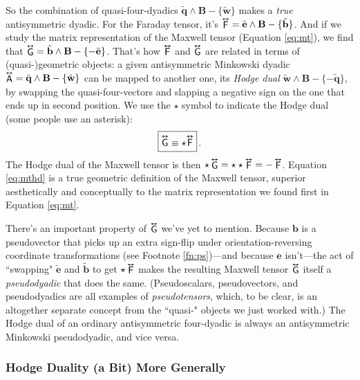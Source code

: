 \documentclass[12pt]{article}
\renewcommand{\vv}[1]{\mathbf{#1}}
\newcommand{\tightoverset}[2]{%
  \mathop{#2}\limits^{\vbox to -.5ex{\kern-0.75ex\hbox{$#1$}\vss}}}
\newcommand{\inlinedy}[1]{\tightoverset{\text{\tiny$\bm\leftrightarrow$}}{#1}}
\newcommand{\capdy}[1]{ \overset{ \text{\tiny$\bm\leftrightarrow$} }{\vphantom{\text{\small{A}}}\smash{#1}} }
\begin{document}

So the combination of quasi-four-dyadics $\tilde{\vv q} \wedge \vv B - \{ \tilde{\vv w} \}$ makes a \emph{true} antisymmetric dyadic. For the Faraday tensor, it's $\inlinedy{\mathsf{F}} = \tilde{\vv e} \wedge \vv B - \{ \tilde{\vv b} \}$. And if we study the matrix representation of the Maxwell tensor (Equation \ref{eq:mt}), we find that $\inlinedy{\mathsf{G}} = \tilde{\vv b} \wedge \vv B - \{ - \tilde{\vv e} \}$. That's how $\inlinedy{\mathsf{F}}$ and $\inlinedy{\mathsf{G}}$ are related in terms of (quasi-)geometric objects: a given antisymmetric Minkowski dyadic ${\inlinedy{\mathsf{A}} = \tilde{\vv q} \wedge \vv B - \{ \tilde{\vv w} \}}$ can be mapped to another one, its \emph{Hodge dual} ${\tilde{\vv w} \wedge \vv B - \{ - \tilde{\vv q} \}}$, by swapping the quasi-four-vectors and slapping a negative sign on the one that ends up in second position. We use the $\star$ symbol to indicate the Hodge dual (some people use an asterisk):
\begin{equation}\label{eq:mthd}
\boxed{ \vphantom{A_{A_A}} \capdy{\mathsf{G}} \equiv \star \capdy{\mathsf{F}} } \, .
\end{equation}
The Hodge dual of the Maxwell tensor is then $\star \inlinedy{\mathsf{G}} = \star \star \inlinedy{\mathsf{F}} = - \inlinedy{\mathsf{F}}$. Equation \ref{eq:mthd} is a true geometric definition of the Maxwell tensor, superior aesthetically and conceptually to the matrix representation we found first in Equation \ref{eq:mt}.

There's an important property of $\inlinedy{\mathsf{G}}$ we've yet to mention. Because $\vv b$ is a pseudovector that picks up an extra sign-flip under orientation-reversing coordinate transformations (see Footnote \ref{fn:ps})---and because $\vv e$ isn't---the act of ``swapping" $\tilde{\vv e}$ and $\tilde{\vv b}$ to get $\star \inlinedy{\mathsf{F}}$ makes the resulting Maxwell tensor $\inlinedy{\mathsf{G}}$ itself a \emph{pseudodyadic} that does the same. (Pseudoscalars, pseudovectors, and pseudodyadics are all examples of \emph{pseudotensors}, which, to be clear, is an altogether separate concept from the ``quasi-" objects we just worked with.) The Hodge dual of an ordinary antisymmetric four-dyadic is always an antisymmetric Minkowski pseudodyadic, and vice versa.

\subsubsection{Hodge Duality (a Bit) More Generally}
\end{document}
